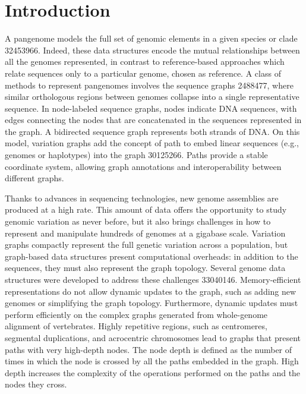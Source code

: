 \documentclass{bioinfo}
\begin{document}
\maketitle

\section{Introduction}

A pangenome models the full set of genomic elements in a given species or clade {32453966}. Indeed, these data structures encode the mutual relationships between all the genomes represented, in contrast to reference-based approaches which relate sequences only to a particular genome, chosen as reference. A class of methods to represent pangenomes involves the sequence graphs {2488477}, where similar orthologous regions between genomes collapse into a single representative sequence. In node-labeled sequence graphs, nodes indicate DNA sequences, with edges connecting the nodes that are concatenated in the sequences represented in the graph. A bidirected sequence graph represents both strands of DNA. On this model, variation graphs add the concept of path to embed linear sequences (e.g., genomes or haplotypes) into the graph {30125266}. Paths provide a stable coordinate system, allowing graph annotations and interoperability between different graphs.

Thanks to advances in sequencing technologies, new genome assemblies are produced at a high rate. This amount of data offers the opportunity to study genomic variation as never before, but it also brings challenges in how to represent and manipulate hundreds of genomes at a gigabase scale. Variation graphs compactly represent the full genetic variation across a population, but graph-based data structures present computational overheads: in addition to the sequences, they must also represent the graph topology. Several genome data structures were developed to address these challenges {33040146}. Memory-efficient representations do not allow dynamic updates to the graph, such as adding new genomes or simplifying the graph topology. Furthermore, dynamic updates must perform efficiently on the complex graphs generated from whole-genome alignment of vertebrates. Highly repetitive regions, such as centromeres, segmental duplications, and acrocentric chromosomes lead to graphs that present paths with very high-depth nodes. The node depth is defined as the number of times in which the node is crossed by all the paths embedded in the graph. High depth increases the complexity of the operations performed on the paths and the nodes they cross.
\end{document}
